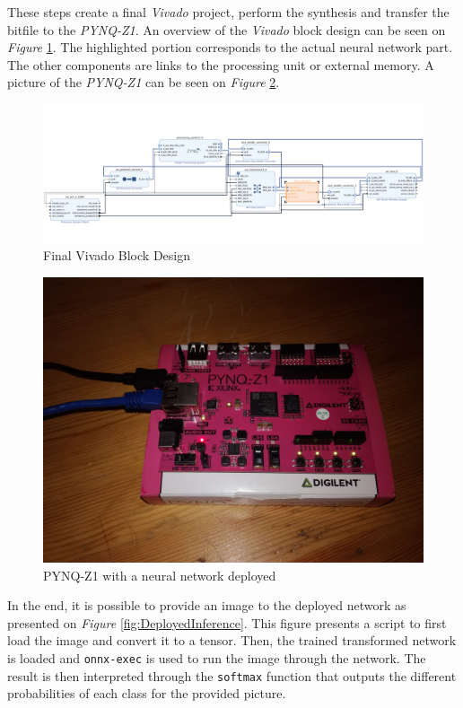 These steps create a final \emph{Vivado} project, perform the synthesis and transfer the bitfile to the \emph{PYNQ-Z1}. An overview of the \emph{Vivado} block design can be seen on \emph{Figure} \ref{fig:ProjectBlockDesign}. The highlighted portion corresponds to the actual neural network part. The other components are links to the processing unit or external memory. A picture of the \emph{PYNQ-Z1} can be seen on \emph{Figure} \ref{fig:PYNQ-Z1}.

\begin{figure}[htbp]
	\centering
		\includegraphics[width=\textwidth]{Figures/ProjectBlockDesign.png}
	\caption[ProjectBlockDesign]{Final Vivado Block Design}
	\label{fig:ProjectBlockDesign}
\end{figure}

\begin{figure}[htbp]
	\centering
		\includegraphics[width=12cm]{Figures/PYNQ.png}
	\caption[PYNQ-Z1]{PYNQ-Z1 with a neural network deployed}
	\label{fig:PYNQ-Z1}
\end{figure}


\newpage

In the end, it is possible to provide an image to the deployed network as presented on \emph{Figure} \ref{fig:DeployedInference}. This figure presents a script to first load the image and convert it to a tensor. Then, the trained transformed network is loaded and \texttt{onnx-exec} is used to run the image through the network. The result is then interpreted through the \texttt{softmax} function that outputs the different probabilities of each class for the provided picture.

